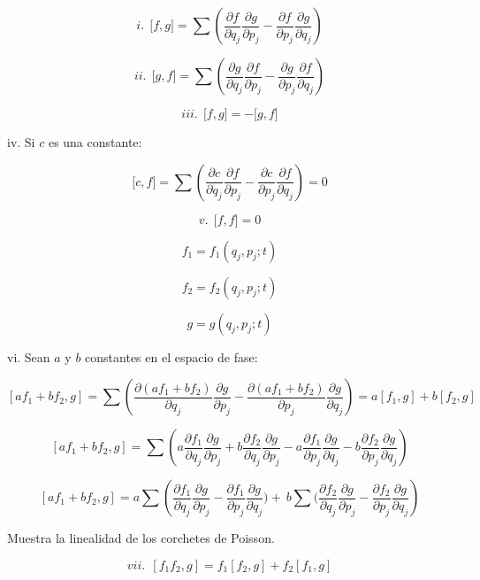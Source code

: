 \documentclass[]{article}
\begin{document}
\[i.\ \ \lbrack f,g\rbrack = \sum_{}^{}\left( \frac{\partial f}{\partial q_{j}}\frac{\partial g}{\partial p_{j}} - \frac{\partial f}{\partial p_{j}}\frac{\partial g}{\partial q_{j}} \right)\]

\[ii.\ \ \lbrack g,f\rbrack = \sum_{}^{}\left( \frac{\partial g}{\partial q_{j}}\frac{\partial f}{\partial p_{j}} - \frac{\partial g}{\partial p_{j}}\frac{\partial f}{\partial q_{j}} \right)\]

\[iii.\ \ \lbrack f,g\rbrack = - \lbrack g,f\rbrack\]

iv. Si \(c\) es una constante:

\[\lbrack c,f\rbrack = \sum_{}^{}\left( \frac{\partial c}{\partial q_{j}}\frac{\partial f}{\partial p_{j}} - \frac{\partial c}{\partial p_{j}}\frac{\partial f}{\partial q_{j}} \right) = 0\]

\[v.\ \ \lbrack f,f\rbrack = 0\]

\[f_{1} = f_{1}\left( q_{j},p_{j};t \right)\]

\[f_{2} = f_{2}\left( q_{j},p_{j};t \right)\]

\[g = g\left( q_{j},p_{j};t \right)\]

vi. Sean \(a\) y \(b\) constantes en el espacio de fase:

\[\left\lbrack af_{1} + bf_{2},g \right\rbrack = \sum_{}^{}\left( \frac{\partial(af_{1} + bf_{2})}{\partial q_{j}}\frac{\partial g}{\partial p_{j}} - \frac{\partial(af_{1} + bf_{2})}{\partial p_{j}}\frac{\partial g}{\partial q_{j}} \right) = a\left\lbrack f_{1},g \right\rbrack + b\left\lbrack f_{2},g \right\rbrack\]

\[\left\lbrack af_{1} + bf_{2},g \right\rbrack = \sum_{}^{}\left( a\frac{\partial f_{1}}{\partial q_{j}}\frac{\partial g}{\partial p_{j}} + b\frac{\partial f_{2}}{\partial q_{j}}\frac{\partial g}{\partial p_{j}} - a\frac{\partial f_{1}}{\partial p_{j}}\frac{\partial g}{\partial q_{j}} - b\frac{\partial f_{2}}{\partial p_{j}}\frac{\partial g}{\partial q_{j}} \right)\]

\[\left\lbrack af_{1} + bf_{2},g \right\rbrack = a\sum_{}^{}\left( \frac{\partial f_{1}}{\partial q_{j}}\frac{\partial g}{\partial p_{j}} - \frac{\partial f_{1}}{\partial p_{j}}\frac{\partial g}{\partial q_{j}}) + \ b\sum_{}^{}{}(\frac{\partial f_{2}}{\partial q_{j}}\frac{\partial g}{\partial p_{j}} - \frac{\partial f_{2}}{\partial p_{j}}\frac{\partial g}{\partial q_{j}} \right)\]

Muestra la linealidad de los corchetes de Poisson.

\[vii.\ \ \left\lbrack f_{1}f_{2},g \right\rbrack = f_{1}\left\lbrack f_{2},g \right\rbrack + f_{2}\left\lbrack f_{1},g \right\rbrack\]
\end{document}
